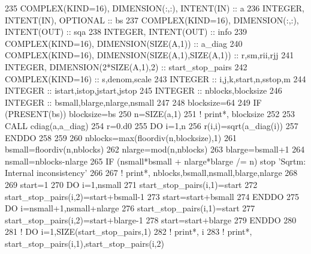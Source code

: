 \begin{DoxyCode}
235     \textcolor{keywordtype}{COMPLEX(KIND=16)}, \textcolor{keywordtype}{DIMENSION(:,:)}, \textcolor{keywordtype}{INTENT(IN)} :: a
236     \textcolor{keywordtype}{INTEGER}, \textcolor{keywordtype}{INTENT(IN)}, \textcolor{keywordtype}{OPTIONAL} :: bs
237     \textcolor{keywordtype}{COMPLEX(KIND=16)}, \textcolor{keywordtype}{DIMENSION(:,:)}, \textcolor{keywordtype}{INTENT(OUT)} :: sqa
238     \textcolor{keywordtype}{INTEGER}, \textcolor{keywordtype}{INTENT(OUT)} :: info
239     \textcolor{keywordtype}{COMPLEX(KIND=16)}, \textcolor{keywordtype}{DIMENSION(SIZE(A,1))} :: a\_diag
240     \textcolor{keywordtype}{COMPLEX(KIND=16)}, \textcolor{keywordtype}{DIMENSION(SIZE(A,1),SIZE(A,1))} :: r,sm,rii,rjj
241     \textcolor{keywordtype}{INTEGER}, \textcolor{keywordtype}{DIMENSION(2*SIZE(A,1),2)} :: start\_stop\_pairs
242     \textcolor{keywordtype}{COMPLEX(KIND=16)} :: s,denom,scale
243     \textcolor{keywordtype}{INTEGER} :: i,j,k,start,n,sstop,m
244     \textcolor{keywordtype}{INTEGER} :: istart,istop,jstart,jstop
245     \textcolor{keywordtype}{INTEGER} :: nblocks,blocksize
246     \textcolor{keywordtype}{INTEGER} :: bsmall,blarge,nlarge,nsmall
247 
248     blocksize=64
249     \textcolor{keywordflow}{IF} (\textcolor{keyword}{PRESENT}(bs)) blocksize=bs
250     n=\textcolor{keyword}{SIZE}(a,1)
251     \textcolor{comment}{! print*,  blocksize}
252 
253     \textcolor{keyword}{CALL }cdiag(a,a\_diag)
254     r=0.d0
255     \textcolor{keywordflow}{DO} i=1,n
256        r(i,i)=sqrt(a\_diag(i))
257 \textcolor{keywordflow}{    ENDDO}
258     
259 
260     nblocks=max(floordiv(n,blocksize),1)
261     bsmall=floordiv(n,nblocks)
262     nlarge=mod(n,nblocks)
263     blarge=bsmall+1
264     nsmall=nblocks-nlarge
265     \textcolor{keywordflow}{IF} (nsmall*bsmall + nlarge*blarge /= n) stop \textcolor{stringliteral}{'Sqrtm: Internal inconsistency'}
266 
267     \textcolor{comment}{! print*, nblocks,bsmall,nsmall,blarge,nlarge}
268 
269     start=1
270     \textcolor{keywordflow}{DO} i=1,nsmall
271        start\_stop\_pairs(i,1)=start
272        start\_stop\_pairs(i,2)=start+bsmall-1
273        start=start+bsmall
274 \textcolor{keywordflow}{    ENDDO}
275     \textcolor{keywordflow}{DO} i=nsmall+1,nsmall+nlarge
276        start\_stop\_pairs(i,1)=start
277        start\_stop\_pairs(i,2)=start+blarge-1
278        start=start+blarge
279 \textcolor{keywordflow}{    ENDDO}
280     
281     \textcolor{comment}{! DO i=1,SIZE(start\_stop\_pairs,1)}
282     \textcolor{comment}{!    print*, i}
283     \textcolor{comment}{!    print*, start\_stop\_pairs(i,1),start\_stop\_pairs(i,2)}

\end{DoxyCode}
